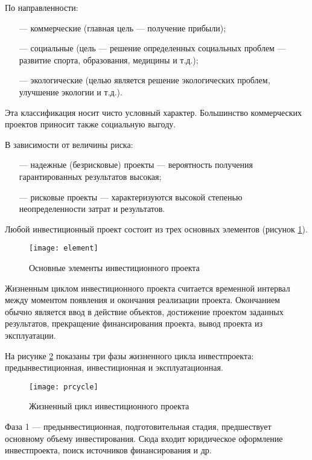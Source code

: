 По направленности:
\begin{enumerate}
	\item [---] коммерческие (главная цель --- получение прибыли);
	\item [---] социальные (цель --- решение определенных социальных проблем --- развитие спорта, образования, медицины и т.д.);
	\item [---] экологические (целью является решение экологических проблем, улучшение экологии и т.д.).
\end{enumerate}

Эта классификация носит чисто условный характер. Большинство коммерческих проектов приносит также социальную выгоду.


В зависимости от величины риска:
\begin{enumerate}
	\item [---] надежные (безрисковые) проекты --- вероятность получения гарантированных результатов высокая;
	\item [---] рисковые проекты --- характеризуются высокой степенью неопределенности затрат и результатов.
\end{enumerate}

Любой инвестиционный проект состоит из трех основных элементов (рисунок \ref{fig:element}).

\begin{figure}[!ht]
	\centering
	\texttt{[image: element]}
	\caption{Основные элементы инвестиционного проекта}
	\label{fig:element}
\end{figure}

Жизненным циклом инвестиционного проекта считается временной интервал между моментом появления и окончания реализации проекта. Окончанием обычно является ввод в действие объектов, достижение проектом заданных результатов, прекращение финансирования проекта, вывод проекта из эксплуатации.

На рисунке \ref{fig:prcycle} показаны три фазы жизненного цикла инвестпроекта: предынвестиционная, инвестиционная и эксплуатационная.

\begin{figure}[!hb]
	\centering
	\texttt{[image: prcycle]}
	\caption{Жизненный цикл инвестиционного проекта}
	\label{fig:prcycle}
\end{figure}

Фаза 1 --- предынвестиционная, подготовительная стадия, предшествует основному объему инвестирования. Сюда входит юридическое оформление инвестпроекта, поиск источников финансирования и др.

